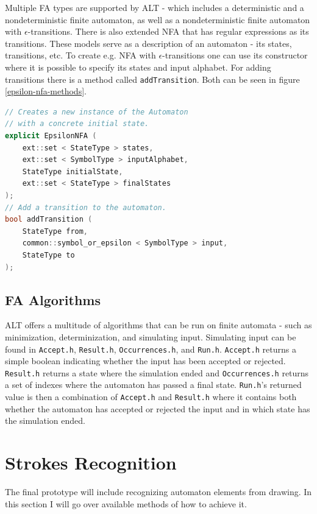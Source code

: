 Multiple FA types are supported by ALT - which includes a deterministic and a nondeterministic finite automaton, as well as a nondeterministic finite automaton with $\epsilon$-transitions. There is also extended NFA that has regular expressions as its transitions. These models serve as a description of an automaton - its states, transitions, etc. To create e.g. NFA with $\epsilon$-transitions one can use its constructor where it is possible to specify its states and input alphabet. For adding transitions there is a method called \lstinline{addTransition}. Both can be seen in figure \ref{epsilon-nfa-methods}.

\begin{lstlisting}[language=C++, caption=EpsilonNFA example methods, label=epsilon-nfa-methods]
// Creates a new instance of the Automaton
// with a concrete initial state.
explicit EpsilonNFA ( 
    ext::set < StateType > states,
    ext::set < SymbolType > inputAlphabet, 
    StateType initialState, 
    ext::set < StateType > finalStates
);
// Add a transition to the automaton.
bool addTransition ( 
    StateType from,
    common::symbol_or_epsilon < SymbolType > input,
    StateType to 
);
\end{lstlisting}

\subsection{FA Algorithms}

ALT offers a multitude of algorithms that can be run on finite automata - such as minimization, determinization, and simulating input. Simulating input can be found in \lstinline{Accept.h}, \lstinline{Result.h}, \lstinline{Occurrences.h}, and \lstinline{Run.h}. \lstinline{Accept.h} returns a simple boolean indicating whether the input has been accepted or rejected. \lstinline{Result.h} returns a state where the simulation ended and \lstinline{Occurrences.h} returns a set of indexes where the automaton has passed a final state. \lstinline{Run.h}'s returned value is then a combination of \lstinline{Accept.h} and \lstinline{Result.h} where it contains both whether the automaton has accepted or rejected the input and in which state has the simulation ended.

\section{Strokes Recognition}

The final prototype will include recognizing automaton elements from drawing. In this section I will go over available methods of how to achieve it.

